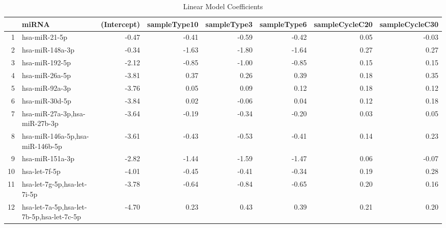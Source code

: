 \documentclass{bioinfo}
\begin{document}
\begin{table}[ht]
\caption {Linear Model Coefficients} \label{tab:1}
\centering
\begin{tabular}{rlrrrrrr}
  \hline
 & miRNA & (Intercept) & sampleType10 & sampleType3 & sampleType6 & sampleCycleC20 & sampleCycleC30 \\ 
  \hline
1 & hsa-miR-21-5p & -0.47 & -0.41 & -0.59 & -0.42 & 0.05 & -0.03 \\ 
  2 & hsa-miR-148a-3p & -0.34 & -1.63 & -1.80 & -1.64 & 0.27 & 0.27 \\ 
  3 & hsa-miR-192-5p & -2.12 & -0.85 & -1.00 & -0.85 & 0.15 & 0.15 \\ 
  4 & hsa-miR-26a-5p & -3.81 & 0.37 & 0.26 & 0.39 & 0.18 & 0.35 \\ 
  5 & hsa-miR-92a-3p & -3.76 & 0.05 & 0.09 & 0.12 & 0.18 & 0.12 \\ 
  6 & hsa-miR-30d-5p & -3.84 & 0.02 & -0.06 & 0.04 & 0.12 & 0.18 \\ 
  7 & hsa-miR-27a-3p,hsa-miR-27b-3p & -3.64 & -0.19 & -0.34 & -0.20 & 0.03 & 0.05 \\ 
  8 & hsa-miR-146a-5p,hsa-miR-146b-5p & -3.61 & -0.43 & -0.53 & -0.41 & 0.14 & 0.23 \\ 
  9 & hsa-miR-151a-3p & -2.82 & -1.44 & -1.59 & -1.47 & 0.06 & -0.07 \\ 
  10 & hsa-let-7f-5p & -4.01 & -0.45 & -0.41 & -0.34 & 0.19 & 0.28 \\ 
  11 & hsa-let-7g-5p,hsa-let-7i-5p & -3.78 & -0.64 & -0.84 & -0.65 & 0.20 & 0.16 \\ 
  12 & hsa-let-7a-5p,hsa-let-7b-5p,hsa-let-7c-5p & -4.70 & 0.23 & 0.43 & 0.39 & 0.21 & 0.20 \\ 
   \hline
\end{tabular}
\end{table}
\end{document}
